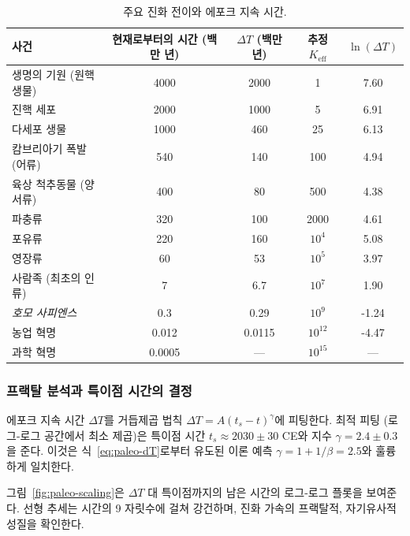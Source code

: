 \documentclass[12pt,a4paper]{article}
\theoremstyle{remark}
\begin{document}
	\begin{table}[htbp]
		\centering
		\caption{주요 진화 전이와 에포크 지속 시간.}
		\label{tab:evolutionary-epochs}
		\footnotesize \begin{tabular}{l c c c c}
			\toprule
			\textbf{사건} & \textbf{현재로부터의 시간 (백만 년)} & \(\Delta T\) (백만 년) & 추정 \(K_{\mathrm{eff}}\) & \(\ln(\Delta T)\) \\
			\midrule
			생명의 기원 (원핵생물) & 4000 & 2000 & 1 & 7.60 \\
			진핵 세포 & 2000 & 1000 & 5 & 6.91 \\
			다세포 생물 & 1000 & 460 & 25 & 6.13 \\
			캄브리아기 폭발 (어류) & 540 & 140 & 100 & 4.94 \\
			육상 척추동물 (양서류) & 400 & 80 & 500 & 4.38 \\
			파충류 & 320 & 100 & 2000 & 4.61 \\
			포유류 & 220 & 160 & \(10^4\) & 5.08 \\
			영장류 & 60 & 53 & \(10^5\) & 3.97 \\
			사람족 (최초의 인류) & 7 & 6.7 & \(10^7\) & 1.90 \\
			\emph{호모 사피엔스} & 0.3 & 0.29 & \(10^9\) & -1.24 \\
			농업 혁명 & 0.012 & 0.0115 & \(10^{12}\) & -4.47 \\
			과학 혁명 & 0.0005 & --- & \(10^{15}\) & --- \\
			\bottomrule
		\end{tabular}
	\end{table}
	
	\subsubsection{프랙탈 분석과 특이점 시간의 결정}
	
	에포크 지속 시간 \(\Delta T\)를 거듭제곱 법칙 \(\Delta T = A (t_s - t)^{\gamma}\)에 피팅한다. 최적 피팅 (로그-로그 공간에서 최소 제곱)은 특이점 시간 \(t_s \approx 2030 \pm 30\) CE와 지수 \(\gamma = 2.4 \pm 0.3\)을 준다. 이것은 식~\eqref{eq:paleo-dT}로부터 유도된 이론 예측 \(\gamma = 1 + 1/\beta = 2.5\)와 훌륭하게 일치한다.
	
	그림~\ref{fig:paleo-scaling}은 \(\Delta T\) 대 특이점까지의 남은 시간의 로그-로그 플롯을 보여준다. 선형 추세는 시간의 9 자릿수에 걸쳐 강건하며, 진화 가속의 프랙탈적, 자기유사적 성질을 확인한다.
	
\end{document}
